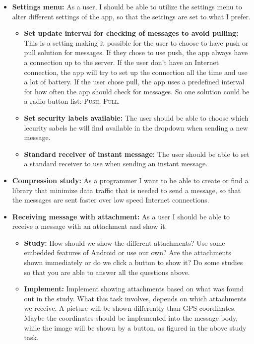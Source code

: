 \begin{itemize}
\newpage

\item{}\textbf{Settings menu:} As a user, I should be able to utilize the settings menu to alter different settings of the app, so that the settings are set to what I prefer.
\begin{itemize}
\item{}\textbf{Set update interval for checking of messages to avoid pulling:} This is a setting making it possible for the user to choose to have push or pull solution for messages. If they chose to use push, the app always have a connection up to the server. If the user don’t have an Internet connection, the app will try to set up the connection all the time and use a lot of battery. If the user chose pull, the app uses a predefined interval for how often the app should check for messages. So one solution could be a radio button list: \textsc{Push}, \textsc{Pull}.
\item{}\textbf{Set security labels available:} The user should be able to choose which lecurity sabels he will find available in the dropdown when sending a new message.
\item{}\textbf{Standard receiver of instant message:} The user should be able to set a standard receiver to use when sending an instant message.
\end{itemize}
\item{}\textbf{Compression study:} As a programmer I want to be able to create or find a library that minimize data traffic that is needed to send a message, so that the messages are sent faster over low speed Internet connections.
\item{}\textbf{Receiving message with attachment:} As a user I should be able to receive a message with an attachment and show it.
\begin{itemize}
\item{}\textbf{Study:} How should we show the different attachments? Use some embedded features of Android or use our own? Are the attachments shown immediately or do we click a button to show it? Do some studies so that you are able to answer all the questions above.
\item{}\textbf{Implement:} Implement showing attachments based on what was found out in the study. What this task involves, depends on which attachments we receive. A picture will be shown differently than GPS coordinates. Maybe the coordinates should be implemented into the message body, while the image will be shown by a button, as figured in the above study task.

\end{itemize}
\end{itemize}
